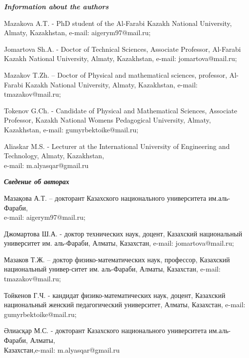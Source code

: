 \emph{{\bfseries Information about the authors}}

\begin{noparindent}

Mazakova A.T. - PhD student of the Al-Farabi Kazakh National University,
Almaty, Kazakhstan, e-mail: aigerym97@mail.ru;

Jomartova Sh.A. - Doctor of Technical Sciences, Associate Professor,
Al-Farabi Kazakh National University, Almaty, Kazakhstan, e-mail:
jomartova@mail.ru;

Mazakov T.Zh. -- Doctor of Physical and mathematical sciences,
professor, Al-Farabi Kazakh National University, Almaty, Kazakhstan,
e-mail: tmazakov@mail.ru;

Tokenov G.Ch. - Candidate of Physical and Mathematical Sciences,
Associate Professor, Kazakh National Women\textquotesingle s Pedagogical
University, Almaty, Kazakhstan, e-mail: gumyrbektoike@mail.ru;

Aliaskar M.S. - Lecturer at the International University of Engineering
and Technology, Almaty, Kazakhstan, \\e-mail: m.alyasqar@gmail.ru
\end{noparindent}

\emph{{\bfseries Сведение об авторах}}
\begin{noparindent}

Мазақова А.Т. -- докторант Казахского национального университета
им.аль-Фараби, \\e-mail: aigerym97@mail.ru;

Джомартова Ш.А. - доктор технических наук, доцент, Казахский
национальный университет им. аль-Фараби, Алматы, Казахстан, e-mail:
jomartova@mail.ru;

Мазаков Т.Ж. -- доктор физико-математических наук, профессор, Казахский
национальный универ-ситет им. аль-Фараби, Алматы, Казахстан, e-mail:
tmazakov@mail.ru;

Тойкенов Г.Ч. - кандидат физико-математических наук, доцент, Казахский
национальный женский педагогический университет, Алматы, Казахстан,
e-mail: gumyrbektoike@mail.ru;

Әлиасқар М.С. - докторант Казахского национального университета
им.аль-Фараби, Алматы,\\Казахстан,e-mail: m.alyasqar@gmail.ru
\end{noparindent}

